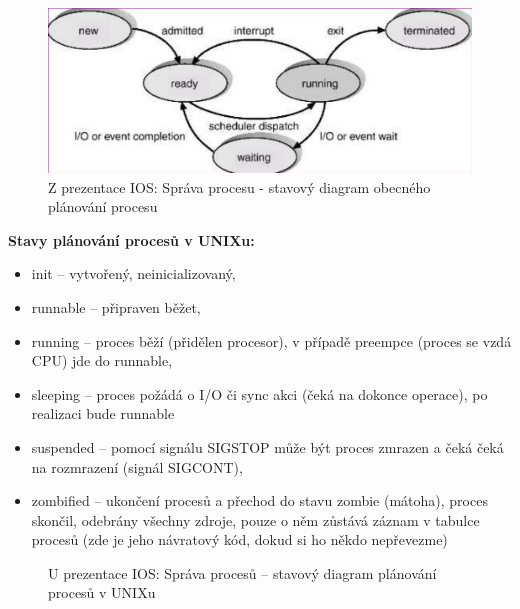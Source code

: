 \documentclass[a4paper, 11pt]{article}
\begin{document}
\begin{figure} [ht]
    \centering
    \includegraphics[width=\textwidth]{8.6_1.jpg}
    \caption{Z prezentace IOS: Správa procesu - stavový diagram obecného plánování procesu}
\end{figure}

\newpage

\textbf{Stavy plánování procesů v UNIXu:}
\begin{itemize}
    \item init -- vytvořený, neinicializovaný,
    \item runnable -- připraven běžet,
    \item running -- proces běží (přidělen procesor), v případě preempce (proces se vzdá CPU) jde do runnable,
    \item sleeping -- proces požádá o I/O či sync akci (čeká na dokonce operace), po realizaci bude runnable
    \item suspended -- pomocí signálu SIGSTOP může být proces zmrazen a čeká čeká na rozmrazení (signál SIGCONT),
    \item zombified -- ukončení procesů a přechod do stavu zombie (mátoha), proces skončil, odebrány všechny zdroje, pouze o něm zůstává záznam v tabulce procesů (zde je jeho návratový kód, dokud si ho někdo nepřevezme)
\end{itemize}
 
\begin{figure} [ht]
    \centering
    \caption{U prezentace IOS: Správa procesů -- stavový diagram plánování procesů v UNIXu}
\end{figure}
 
\end{document}
